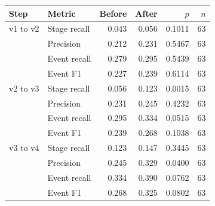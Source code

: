 \begin{tabular}{@{}llrrrr@{}}
\toprule
Step & Metric & Before & After & $p$ & $n$ \\
\midrule
v1 to v2 & Stage recall & 0.043 & 0.056 & 0.1011 & 63 \\
 & Precision & 0.212 & 0.231 & 0.5467 & 63 \\
 & Event recall & 0.279 & 0.295 & 0.5439 & 63 \\
 & Event F1 & 0.227 & 0.239 & 0.6114 & 63 \\
v2 to v3 & Stage recall & 0.056 & 0.123 & 0.0015 & 63 \\
 & Precision & 0.231 & 0.245 & 0.4232 & 63 \\
 & Event recall & 0.295 & 0.334 & 0.0515 & 63 \\
 & Event F1 & 0.239 & 0.268 & 0.1038 & 63 \\
v3 to v4 & Stage recall & 0.123 & 0.147 & 0.3445 & 63 \\
 & Precision & 0.245 & 0.329 & 0.0400 & 63 \\
 & Event recall & 0.334 & 0.390 & 0.0762 & 63 \\
 & Event F1 & 0.268 & 0.325 & 0.0802 & 63 \\
\bottomrule
\end{tabular}
